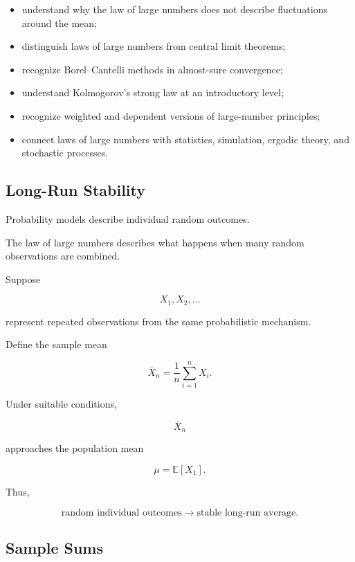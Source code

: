 {\begin{itemize}
    \item understand why the law of large numbers does not describe
          fluctuations around the mean;
    \item distinguish laws of large numbers from central limit theorems;
    \item recognize Borel--Cantelli methods in almost-sure convergence;
    \item understand Kolmogorov's strong law at an introductory level;
    \item recognize weighted and dependent versions of large-number
          principles;
    \item connect laws of large numbers with statistics, simulation,
          ergodic theory, and stochastic processes.
\end{itemize}
}

\subsection{Long-Run Stability}
\label{subsec:lln-long-run-stability}

Probability models describe individual random outcomes.

The law of large numbers describes what happens when many random
observations are combined.

Suppose

\[
X_1,X_2,\ldots
\]

represent repeated observations from the same probabilistic mechanism.

Define the sample mean

\[
\boxed{
\overline{X}_n
=
\frac1n
\sum_{i=1}^{n}X_i.
}
\]

Under suitable conditions,

\[
\overline{X}_n
\]

approaches the population mean

\[
\mu=\mathbb{E}[X_1].
\]

Thus,

\[
\boxed{
\text{random individual outcomes}
\longrightarrow
\text{stable long-run average}.
}
\]

\subsection{Sample Sums}
\label{subsec:lln-sample-sums}


